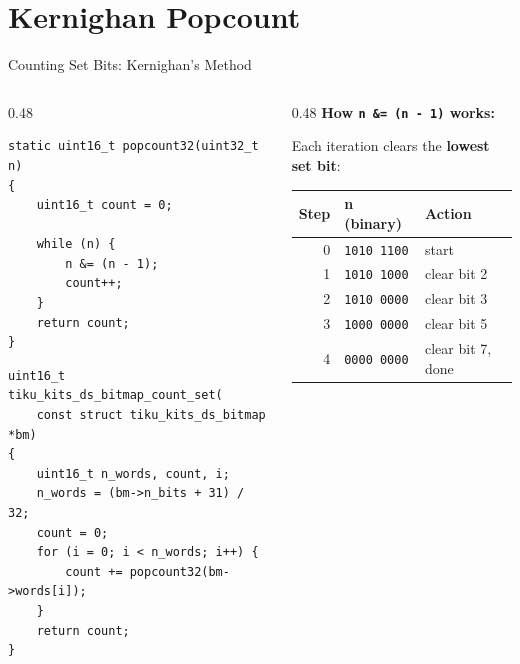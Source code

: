 \documentclass[aspectratio=169, 10pt]{beamer}
\begin{document}
\section{Kernighan Popcount}

\begin{frame}[fragile]{Counting Set Bits: Kernighan's Method}
\begin{columns}[T]
\begin{column}{0.48\textwidth}
\begin{lstlisting}[style=cstyle,
  title={popcount32 --- count set bits in a word}]
static uint16_t popcount32(uint32_t n)
{
    uint16_t count = 0;

    while (n) {
        n &= (n - 1);
        count++;
    }
    return count;
}
\end{lstlisting}

\begin{lstlisting}[style=cstyle,
  title={count\_set --- sum across all words}]
uint16_t tiku_kits_ds_bitmap_count_set(
    const struct tiku_kits_ds_bitmap *bm)
{
    uint16_t n_words, count, i;
    n_words = (bm->n_bits + 31) / 32;
    count = 0;
    for (i = 0; i < n_words; i++) {
        count += popcount32(bm->words[i]);
    }
    return count;
}
\end{lstlisting}
\end{column}

\begin{column}{0.48\textwidth}
\textbf{How \texttt{n \&= (n - 1)} works:}

\vspace{0.3em}
Each iteration clears the \textbf{lowest set bit}:
\begin{center}
\begin{tabular}{@{}rll@{}}
\toprule
\textbf{Step} & \textbf{n (binary)} & \textbf{Action} \\
\midrule
0 & \texttt{1010 1100} & start \\
1 & \texttt{1010 1000} & clear bit 2 \\
2 & \texttt{1010 0000} & clear bit 3 \\
3 & \texttt{1000 0000} & clear bit 5 \\
4 & \texttt{0000 0000} & clear bit 7, done \\
\bottomrule
\end{tabular}
\end{center}


\end{column}
\end{columns}
\end{frame}
\end{document}
